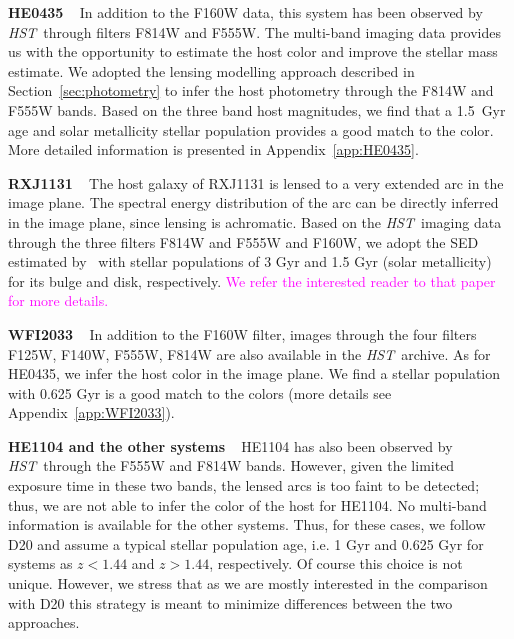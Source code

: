 \documentclass[fleqn,usenatbib]{mnras}
\newcommand{\hst}{{\it HST}}
\newcommand{\pink}[1]{{\textcolor{magenta}{#1}}}
\begin{document}
{\bf HE0435} ~ In addition to the F160W data, this system has been observed by \hst\ through filters F814W and F555W. The multi-band imaging data provides us with the opportunity to estimate the host color and improve the stellar mass estimate. We adopted the lensing modelling approach described in Section~\ref{sec:photometry} to infer the host photometry through the F814W and F555W bands. Based on the three band host magnitudes, we find that a 1.5~Gyr age and solar metallicity stellar population provides a good match to the color. More detailed information is presented in Appendix~\ref{app:HE0435}.

{\bf RXJ1131} ~ The host galaxy of RXJ1131 is lensed to a very extended arc in the image plane. The spectral energy distribution of the arc can be directly inferred in the image plane, since lensing is achromatic. Based on the \hst\ imaging data through the three filters F814W and F555W and F160W, we adopt the SED estimated by~\citet{Ding2017b} with stellar populations of 3 Gyr and 1.5 Gyr (solar metallicity) for its bulge and disk, respectively. \pink{We refer the interested reader to that paper for more details.}

{\bf WFI2033} ~ In addition to the F160W filter, images through the four filters F125W, F140W, F555W, F814W are also available in the \hst\ archive. As for HE0435, we infer the host color in the image plane. We find a stellar population with 0.625 Gyr is a good match to the colors (more details see Appendix~\ref{app:WFI2033}).

{\bf HE1104 and the other systems} ~ HE1104 has also been observed by \hst\ through the F555W and F814W bands. However, given the limited exposure time in these two bands, the lensed arcs is too faint to be detected; thus, we are not able to infer the color of the host for HE1104. No multi-band information is available for the other systems. Thus, for these cases, we follow D20 and assume a typical stellar population age, i.e. 1 Gyr and 0.625 Gyr for systems as $z<1.44$ and $z>1.44$, respectively. Of course this choice is not unique. However, we stress that as we are mostly interested in the comparison with D20 this strategy is meant to minimize differences between the two approaches.
\end{document}
